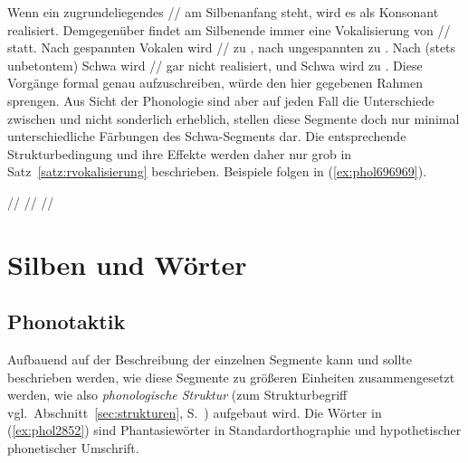 Wenn ein zugrundeliegendes // am Silbenanfang steht, wird es als Konsonant \textipa{[K]} realisiert.
Demgegenüber findet am Silbenende immer eine Vokalisierung von // statt.
Nach gespannten Vokalen wird // zu \textipa{[5]}, nach ungespannten zu \textipa{[@]}.
Nach (stets unbetontem) Schwa wird // gar nicht realisiert, und Schwa wird zu \textipa{[5]}.
Diese Vorgänge formal genau aufzuschreiben, würde den hier gegebenen Rahmen sprengen.
Aus Sicht der Phonologie sind aber auf jeden Fall die Unterschiede zwischen \textipa{[@]} und \textipa{[5]} nicht sonderlich erheblich, stellen diese Segmente doch nur minimal unterschiedliche Färbungen des Schwa-Segments dar.
Die entsprechende Strukturbedingung und ihre Effekte werden daher nur grob in Satz~\ref{satz:rvokalisierung} beschrieben.
Beispiele folgen in (\ref{ex:phol696969}).


\begin{exe}
  \ex \label{ex:phol696969}
  \begin{xlist}
  	\ex // \phopro \textipa{[g@.KIN.5]}
  	\ex // \phopro \textipa{[t\t{i5}]}
  	\ex // \phopro \textipa{[b\t{I@}.k@]}
  \end{xlist}
\end{exe}


\section{Silben und Wörter}

\label{sec:phonotaktik}

\subsection{Phonotaktik}

Aufbauend auf der Beschreibung der einzelnen Segmente kann und sollte beschrieben werden, wie diese Segmente zu größeren Einheiten zusammengesetzt werden, wie also \textit{phonologische Struktur} (zum Strukturbegriff vgl.\ Abschnitt~\ref{sec:strukturen}, S.~\pageref{sec:strukturen}) aufgebaut wird.
Die Wörter in (\ref{ex:phol2852}) sind Phantasiewörter in Standardorthographie und hypothetischer phonetischer Umschrift.

\begin{exe}
  \ex\label{ex:phol2852}
  \begin{xlist}
  \end{xlist}
\end{exe}

